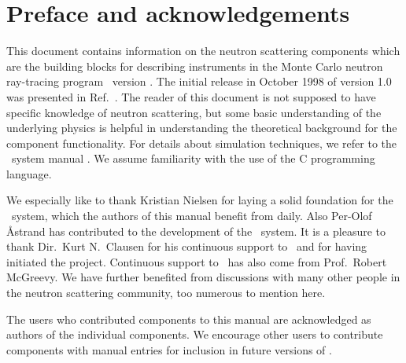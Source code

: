 
\chapter*{Preface and acknowledgements}
This document contains information on the neutron scattering components 
which are the building blocks for describing instruments 
in the Monte Carlo neutron
ray-tracing program \MCS\ version \version . The initial
release in October 1998 of version 1.0 was presented in Ref.~\cite{NNews}. 
The reader of this
document is not supposed to have specific knowledge of neutron scattering,
but some basic understanding of the underlying physics is helpful in
understanding the theoretical background for the component functionality. 
For details about simulation techniques, we refer to 
the \MCS\ system manual \cite{mcstasmanual}.
We assume familiarity with the use of 
the C programming language.

We especially like to thank Kristian Nielsen for laying a solid foundation
for the \MCS\ system, which the authors of this manual benefit from daily.
Also Per-Olof \AA strand has contributed to the development of
the \MCS\ system.
It is a pleasure to thank Dir.~Kurt N.~Clausen for his continuous
support to \MCS\ and for having initiated the project.
Continuous support to \MCS\ has also come from Prof.~Robert McGreevy.
We have further benefited
from discussions with many other people in the neutron scattering
community, too numerous to mention here.

The users who contributed components to this manual are acknowledged
as authors of the individual components. We encourage other
users to contribute components with manual entries for inclusion in
future versions of \MCS.

